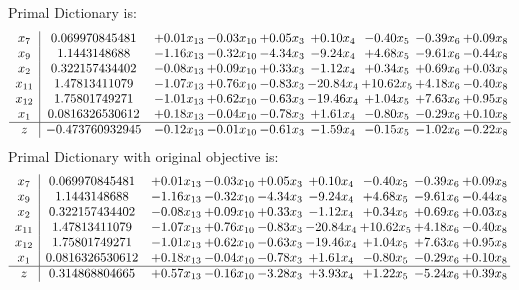 \documentclass[9pt]{article}
\begin{document}
Primal Dictionary is:
\[\begin{array}{c| c c@{\hskip 2pt} c@{\hskip 2pt} c@{\hskip 2pt} c@{\hskip 2pt} c@{\hskip 2pt} c@{\hskip 2pt} c@{\hskip 2pt} }
 x_{7}   &  0.069970845481 & +  0.01 x_{13} & -0.03 x_{10} & +  0.05 x_{3} & +  0.10 x_{4} & -0.40 x_{5} & -0.39 x_{6} & +  0.09 x_{8}\\
 x_{9}   &  1.1443148688 & -1.16 x_{13} & -0.32 x_{10} & -4.34 x_{3} & -9.24 x_{4} & +  4.68 x_{5} & -9.61 x_{6} & -0.44 x_{8}\\
 x_{2}   &  0.322157434402 & -0.08 x_{13} & +  0.09 x_{10} & +  0.33 x_{3} & -1.12 x_{4} & +  0.34 x_{5} & +  0.69 x_{6} & +  0.03 x_{8}\\
 x_{11}   &  1.47813411079 & -1.07 x_{13} & +  0.76 x_{10} & -0.83 x_{3} & -20.84 x_{4} & + 10.62 x_{5} & +  4.18 x_{6} & -0.40 x_{8}\\
 x_{12}   &  1.75801749271 & -1.01 x_{13} & +  0.62 x_{10} & -0.63 x_{3} & -19.46 x_{4} & +  1.04 x_{5} & +  7.63 x_{6} & +  0.95 x_{8}\\
 x_{1}   &  0.0816326530612 & +  0.18 x_{13} & -0.04 x_{10} & -0.78 x_{3} & +  1.61 x_{4} & -0.80 x_{5} & -0.29 x_{6} & +  0.10 x_{8}\\
\hline
z    &  -0.473760932945 & -0.12 x_{13} & -0.01 x_{10} & -0.61 x_{3} & -1.59 x_{4} & -0.15 x_{5} & -1.02 x_{6} & -0.22 x_{8}\\
\end{array}\]
Primal Dictionary with original objective is:
\[\begin{array}{c| c c@{\hskip 2pt} c@{\hskip 2pt} c@{\hskip 2pt} c@{\hskip 2pt} c@{\hskip 2pt} c@{\hskip 2pt} c@{\hskip 2pt} }
 x_{7}   &  0.069970845481 & +  0.01 x_{13} & -0.03 x_{10} & +  0.05 x_{3} & +  0.10 x_{4} & -0.40 x_{5} & -0.39 x_{6} & +  0.09 x_{8}\\
 x_{9}   &  1.1443148688 & -1.16 x_{13} & -0.32 x_{10} & -4.34 x_{3} & -9.24 x_{4} & +  4.68 x_{5} & -9.61 x_{6} & -0.44 x_{8}\\
 x_{2}   &  0.322157434402 & -0.08 x_{13} & +  0.09 x_{10} & +  0.33 x_{3} & -1.12 x_{4} & +  0.34 x_{5} & +  0.69 x_{6} & +  0.03 x_{8}\\
 x_{11}   &  1.47813411079 & -1.07 x_{13} & +  0.76 x_{10} & -0.83 x_{3} & -20.84 x_{4} & + 10.62 x_{5} & +  4.18 x_{6} & -0.40 x_{8}\\
 x_{12}   &  1.75801749271 & -1.01 x_{13} & +  0.62 x_{10} & -0.63 x_{3} & -19.46 x_{4} & +  1.04 x_{5} & +  7.63 x_{6} & +  0.95 x_{8}\\
 x_{1}   &  0.0816326530612 & +  0.18 x_{13} & -0.04 x_{10} & -0.78 x_{3} & +  1.61 x_{4} & -0.80 x_{5} & -0.29 x_{6} & +  0.10 x_{8}\\
\hline
z    &  0.314868804665 & +  0.57 x_{13} & -0.16 x_{10} & -3.28 x_{3} & +  3.93 x_{4} & +  1.22 x_{5} & -5.24 x_{6} & +  0.39 x_{8}\\
\end{array}\]
\end{document}

